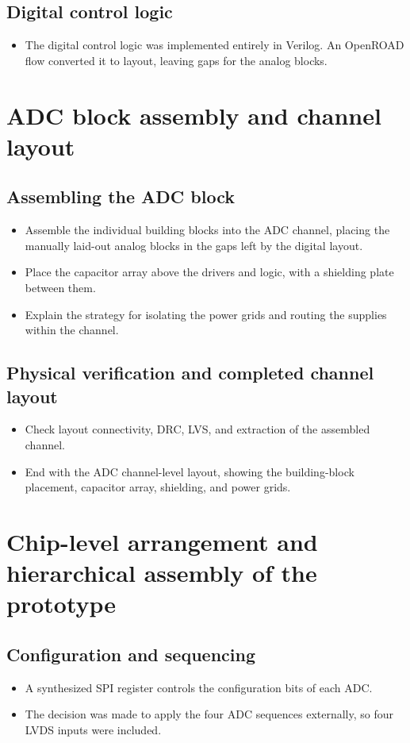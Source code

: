 \documentclass[PhD, UKenglish]{scrbook}
\begin{document}
\subsection{Digital control logic}
\begin{itemize}
  \item The digital control logic was implemented entirely in Verilog. An OpenROAD flow converted it to layout, leaving gaps for the analog blocks.
\end{itemize}

\section{ADC block assembly and channel layout}
\subsection{Assembling the ADC block}
\begin{itemize}
  \item Assemble the individual building blocks into the ADC channel, placing the manually laid-out analog blocks in the gaps left by the digital layout.
  \item Place the capacitor array above the drivers and logic, with a shielding plate between them.
  \item Explain the strategy for isolating the power grids and routing the supplies within the channel.
\end{itemize}
\subsection{Physical verification and completed channel layout}
\begin{itemize}
  \item Check layout connectivity, DRC, LVS, and extraction of the assembled channel.
  \item End with the ADC channel-level layout, showing the building-block placement, capacitor array, shielding, and power grids.
\end{itemize}

\section{Chip-level arrangement and hierarchical assembly of the prototype}
\subsection{Configuration and sequencing}
\begin{itemize}
  \item A synthesized SPI register controls the configuration bits of each ADC.
  \item The decision was made to apply the four ADC sequences externally, so four LVDS inputs were included.
\end{itemize}
\end{document}
